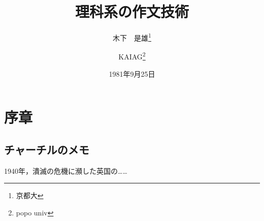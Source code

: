\documentclass[uplatex]{jsarticle}
\begin{document}
\title{理科系の作文技術}
\author{木下　是雄\thanks{京都大} \and KAIAG\thanks{popo univ}}
\date{1981年9月25日}
\maketitle

\section{序章}

\subsection{チャーチルのメモ}

1940年，潰滅の危機に瀕した英国の……
\end{document}
